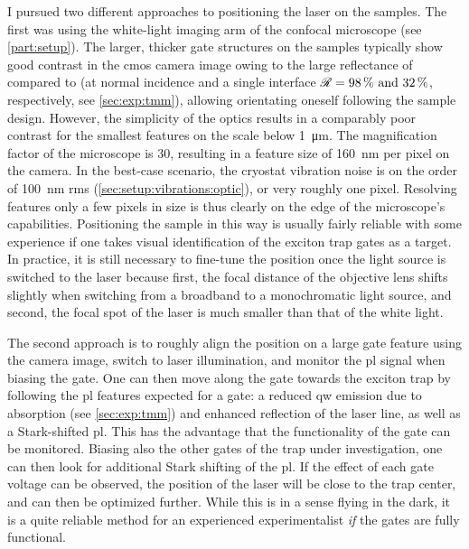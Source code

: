 I pursued two different approaches to positioning the laser on the samples.
The first was using the white-light imaging arm of the confocal microscope (see \cref{part:setup}).
The larger, thicker gate structures on the samples typically show good contrast in the \gls{cmos} camera image owing to the large reflectance of  compared to  (at normal incidence and a single interface $\reflectance = \qtylist{98;32}{\percent}$, respectively, see \cref{sec:exp:tmm}), allowing orientating oneself following the sample design.
However, the simplicity of the optics
results in a comparably poor contrast for the smallest features on the scale below \qty{1}{\micro\meter}.
The magnification factor of the microscope is \num{30}, resulting in a feature size of \qty{160}{\nano\meter} per pixel on the camera.
In the best-case scenario, the cryostat vibration noise is on the order of \qty{100}{\nano\meter} \gls{rms} (\cref{sec:setup:vibrations:optic}), or very roughly one pixel.
Resolving features only a few pixels in size is thus clearly on the edge of the microscope's capabilities.
Positioning the sample in this way is usually fairly reliable with some experience if one takes visual identification of the exciton trap gates as a target.
In practice, it is still necessary to fine-tune the position once the light source is switched to the laser because first, the focal distance of the objective lens shifts slightly when switching from a broadband to a monochromatic light source, and second, the focal spot of the laser is much smaller than that of the white light.

The second approach is to roughly align the position on a large gate feature using the camera image, switch to laser illumination, and monitor the \gls{pl} signal when biasing the gate.
One can then move along the gate towards the exciton trap by following the \gls{pl} features expected for a gate: a reduced \gls{qw} emission due to absorption (see \cref{sec:exp:tmm}) and enhanced reflection of the laser line, as well as a Stark-shifted \gls{pl}.
This has the advantage that the functionality of the gate can be monitored.
Biasing also the other gates of the trap under investigation, one can then look for additional Stark shifting of the \gls{pl}.
If the effect of each gate voltage can be observed, the position of the laser will be close to the trap center, and can then be optimized further.
While this is in a sense flying in the dark, it is a quite reliable method for an experienced experimentalist \emph{if} the gates are fully functional.

